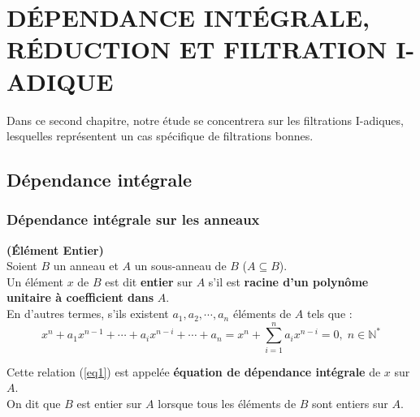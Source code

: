 \chapter{DÉPENDANCE INTÉGRALE, RÉDUCTION ET FILTRATION I-ADIQUE}

Dans ce second chapitre, notre étude se concentrera sur les filtrations I-adiques, lesquelles représentent un cas spécifique de filtrations bonnes.

\section{Dépendance intégrale}
\subsection{Dépendance intégrale sur les anneaux}
\begin{madefinition}\textbf{(Élément Entier)}\cite{Di2} \\
	Soient $B$ un anneau et $A$ un sous-anneau de $B$ ($A \subseteq B$).\\
	Un élément $x$ de $B$ est dit \textbf{entier} sur $A$ s'il est \textbf{racine d'un polynôme unitaire à coefficient dans} $A$.\\
	En d'autres termes, s'ils existent $a_1, a_2, \cdots , a_n$ éléments de $A$ tels que :\\
	\begin{equation}
		\label{eq1}
		x^n + a_1 x^{n-1} +\cdots+a_i x^{n-i} +\cdots + a_n = x^n + \sum_{i=1}^{n} a_i x^{n-i} = 0, \; n \in \mathbb{N^*}
	\end{equation}
	
	Cette relation (\ref{eq1}) est appelée \textbf{équation de dépendance intégrale} de $x$ sur $A$.\\
	On dit que $B$ est entier sur $A$ lorsque tous les éléments de $B$ sont entiers sur $A$.
\end{madefinition}

